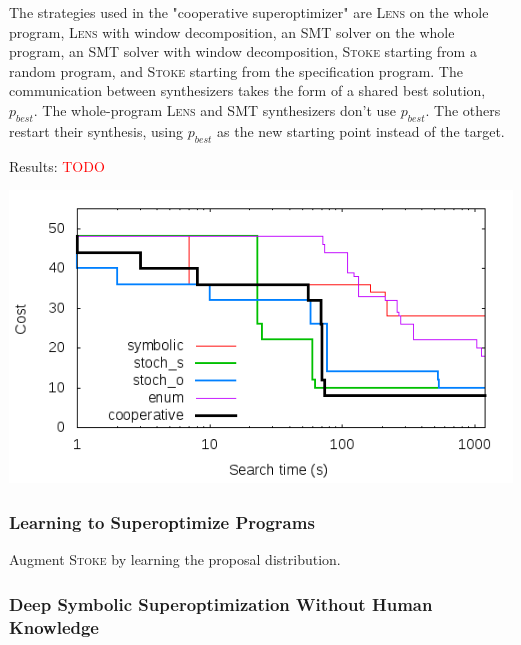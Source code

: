 \documentclass[12pt,twoside]{reedthesis}
\newcommand{\red}[1]{\textcolor{red}{#1}}
\begin{document}
The strategies used in the "cooperative superoptimizer" are
    \textsc{Lens} on the whole program,
    \textsc{Lens} with window decomposition,
    an SMT solver on the whole program,
    an SMT solver with window decomposition,
    \textsc{Stoke} starting from a random program, and
    \textsc{Stoke} starting from the specification program.
The communication between synthesizers takes the form of a shared best solution, $p_{best}$.
The whole-program \textsc{Lens} and SMT synthesizers don't use $p_{best}$. The others restart their synthesis, using $p_{best}$ as the new starting point instead of the target.

Results: \red{TODO}

\includegraphics[scale=0.5]{scaling}



\subsubsection{Learning to Superoptimize Programs}
\cite{bunel2017learning}
Augment \textsc{Stoke} by learning the proposal distribution.

\subsubsection{Deep Symbolic Superoptimization Without Human Knowledge}
\cite{hui2020deep}
\end{document}
